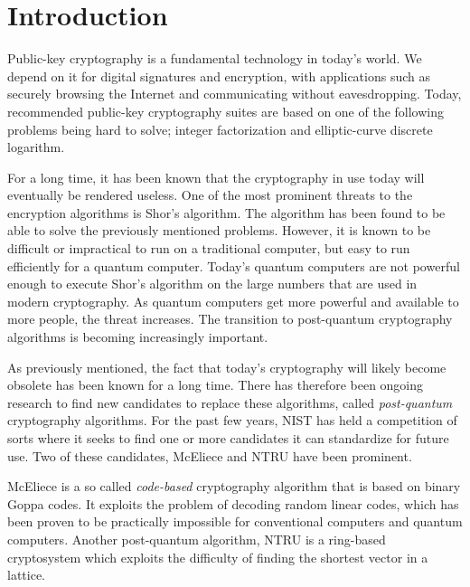 \chapter{Introduction}
\label{chapter:introduction}


Public-key cryptography is a fundamental technology in today's world. We depend on it for digital signatures and encryption, with applications such as securely browsing the Internet and communicating without eavesdropping. Today, recommended public-key cryptography suites are based on one of the following problems being hard to solve; integer factorization and elliptic-curve discrete logarithm\cite{nsa2015, nist2019}.

For a long time, it has been known that the cryptography in use today will eventually be rendered useless. One of the most prominent threats to the encryption algorithms is Shor's algorithm\cite{shor1997}. The algorithm has been found to be able to solve the previously mentioned problems. However, it is known to be difficult or impractical to run on a traditional computer, but easy to run efficiently for a quantum computer. Today's quantum computers are not powerful enough to execute Shor's algorithm on the large numbers that are used in modern cryptography. As quantum computers get more powerful and available to more people, the threat increases. The transition to post-quantum cryptography algorithms is becoming increasingly important.


As previously mentioned, the fact that today's cryptography will likely become obsolete has been known for a long time. There has therefore been ongoing research to find new candidates to replace these algorithms, called \textit{post-quantum} cryptography algorithms. For the past few years, NIST has held a competition of sorts where it seeks to find one or more candidates it can standardize for future use. Two of these candidates, McEliece and NTRU have been prominent\cite{nist2020}.

McEliece is a so called \textit{code-based} cryptography algorithm that is based on binary Goppa codes. It exploits the problem of decoding random linear codes, which has been proven to be practically impossible for conventional computers and quantum computers\cite{mceliece1978}. Another post-quantum algorithm, NTRU is a ring-based cryptosystem which exploits the difficulty of finding the shortest vector in a lattice\cite{ntru1998}.

